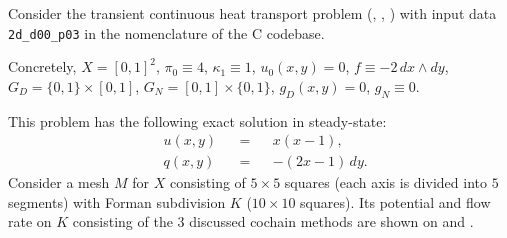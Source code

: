 \begin{example}
  \label{cmc/diffusion/continuous/transient/examples/2d_d00_p03-example}
  Consider the transient continuous heat transport problem
  (,
   ,
   )
  with input data \verb|2d_d00_p03| in the nomenclature of the C codebase.

  Concretely,
    $X = [0, 1]^2$,
    $\pi_0 \equiv 4$,
    $\kappa_1 \equiv 1$,
    $u_0(x, y) = 0$,
    $f \equiv -2\, d x \wedge d y$,
    $G_D = \{0, 1\} \times [0, 1]$,
    $G_N = [0, 1] \times \{0, 1\}$,
    $g_D(x, y) = 0$,
    $g_N \equiv 0$.

  This problem has the following exact solution in steady-state:
  \begin{subequations}
    \begin{alignat}{3}
      & u(x, y) && = && x (x - 1), \\
      & q(x, y) && = && - (2 x - 1)\, d y.
    \end{alignat}
  \end{subequations}
  Consider a mesh $M$ for $X$ consisting of $5 \times 5$ squares (each axis is
  divided into $5$ segments) with Forman subdivision $K$
  ($10 \times 10$ squares).
  Its potential and flow rate on $K$ consisting of the $3$ discussed cochain
  methods are shown on
  and
  .
\end{example}
